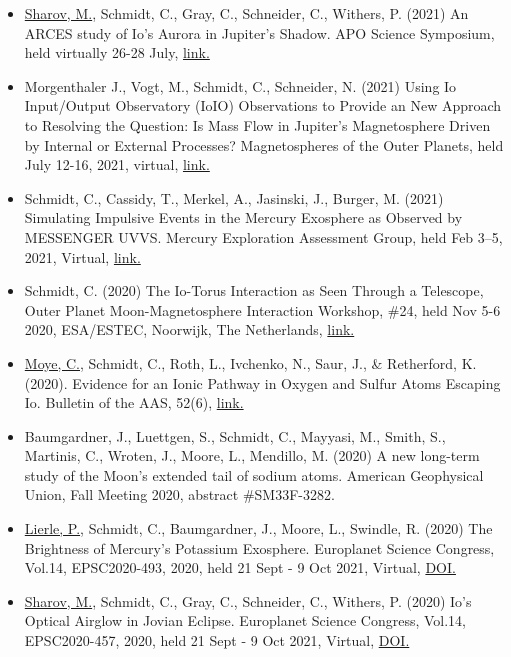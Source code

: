 \documentclass[12pt]{report}
\begin{document}
\begin{itemize}
   \item \underline{Sharov, M.}, Schmidt, C., Gray, C., Schneider, C., Withers, P. (2021) An ARCES study of Io's Aurora in Jupiter’s Shadow. APO Science Symposium, held virtually 26-28 July, \href{ http://astronomy.nmsu.edu/aposcisymposium21/}{link.} 
   \item Morgenthaler J., Vogt, M., Schmidt, C., Schneider, N. (2021) Using Io Input/Output Observatory (IoIO) Observations to Provide an New Approach to Resolving the Question: Is Mass Flow in Jupiter's Magnetosphere Driven by Internal or External Processes? Magnetospheres of the Outer Planets, held July 12-16, 2021, virtual, \href{https://www.mop.uliege.be/upload/docs/application/pdf/2021-06/mop21_conference_booklet.pdf}{link.} 
   \item Schmidt, C., Cassidy, T., Merkel, A., Jasinski, J., Burger, M. (2021) Simulating Impulsive Events in the Mercury Exosphere as Observed by MESSENGER UVVS. Mercury Exploration Assessment Group, held Feb 3–5, 2021, Virtual, \href{https://www.hou.usra.edu/meetings/mexag2021/pdf/mexag2021_program.htm#sess201}{link.} 
   \item Schmidt, C. (2020) The Io-Torus Interaction as Seen Through a Telescope, Outer Planet Moon-Magnetosphere Interaction Workshop, \#24, held Nov 5-6 2020, ESA/ESTEC, Noorwijk, The Netherlands, \href{https://indico.esa.int/event/337/contributions/5611/contribution.pdf}{link.} 
   \item \underline{Moye, C.}, Schmidt, C., Roth, L., Ivchenko, N., Saur, J., \& Retherford, K. (2020). Evidence for an Ionic Pathway in Oxygen and Sulfur Atoms Escaping Io. Bulletin of the AAS, 52(6), \href{https://baas.aas.org/pub/2020n6i318p02}{link.}
   \item Baumgardner, J., Luettgen, S., Schmidt, C., Mayyasi, M., Smith, S., Martinis, C., Wroten, J., Moore, L., Mendillo, M. (2020) A new long-term study of the Moon’s extended tail of sodium atoms. American Geophysical Union, Fall Meeting 2020, abstract \#SM33F-3282.
   \item \underline{Lierle, P.}, Schmidt, C., Baumgardner, J., Moore, L., Swindle, R. (2020) The Brightness of Mercury's Potassium Exosphere. Europlanet Science Congress, Vol.14, EPSC2020-493, 2020, held 21 Sept - 9 Oct 2021, Virtual, \href{https://doi.org/10.5194/epsc2020-493}{DOI.}
   \item \underline{Sharov, M.}, Schmidt, C., Gray, C., Schneider, C., Withers, P. (2020) Io's Optical Airglow in Jovian Eclipse. Europlanet Science Congress, Vol.14, EPSC2020-457, 2020, held 21 Sept - 9 Oct 2021, Virtual, \href{https://doi.org/10.5194/epsc2020-457}{DOI.}

\end{itemize}
\end{document}
